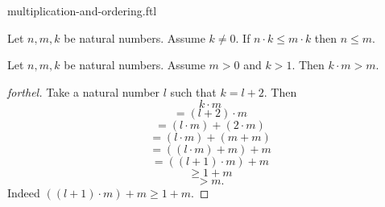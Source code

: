 \documentclass{naproche-library}
\begin{document}
\begin{smodule}{multiplication-and-ordering.ftl}
  \begin{corollary}[forthel,id=ARITHMETIC_06_4374428949413888]
    Let $n, m, k$ be natural numbers.
    Assume $k \neq 0$.
    If $n \cdot k \leq m \cdot k$ then $n \leq m$.
  \end{corollary}

  \begin{proposition}[forthel,id=ARITHMETIC_06_8813409145454592]
    Let $n, m, k$ be natural numbers.
    Assume $m > 0$ and $k > 1$.
    Then $k \cdot m > m$.
  \end{proposition}
  \begin{proof}[forthel]
    Take a natural number $l$ such that $k = l + 2$.
    Then
    \[  k \cdot m                       \]
    \[    = (l + 2) \cdot m             \]
    \[    = (l \cdot m) + (2 \cdot m)   \]
    \[    = (l \cdot m) + (m + m)       \]
    \[    = ((l \cdot m) + m) + m       \]
    \[    = ((l + 1) \cdot m) + m       \]
    \[    \geq 1 + m                    \]
    \[    > m.                          \]
    Indeed $((l + 1) \cdot m) + m \geq 1 + m$.
  \end{proof}
\end{smodule}
\end{document}
